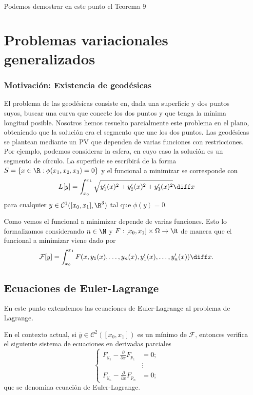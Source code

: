 \documentclass{article}
\begin{document}
Podemos demostrar en este punto el Teorema 9

\section{Problemas variacionales generalizados}

\subsubsection{Motivación: Existencia de geodésicas}

El problema de las geodésicas consiste en, dada una superficie y dos puntos suyos, buscar una curva
que conecte los dos puntos y que tenga la mínima longitud posible. Nosotros hemos resuelto
parcialmente este problema en el plano, obteniendo que la solución era el segmento que une los dos
puntos. Las geodésicas se plantean mediante un PV que dependen de varias funciones con
restricciones. Por ejemplo, podemos considerar la esfera, en cuyo caso la solución es un segmento de
círculo. La superficie se escribirá de la forma $S = \{x \in \R: \phi(x_1, x_2, x_3) = 0\}$ y el
funcional a minimizar se corresponde con
\[L[y] = \int_{x_0}^{x_1} \sqrt{y_1'(x)^2 + y_2'(x)^2 +y_3'(x)^2} \diff x\] para cualquier
$y \in \mathcal{C}^1([x_0, x_1], \R^3)$ tal que $\phi(y) = 0$.

Como vemos el funcional a minimizar depende de varias funciones. Esto lo formalizamos considerando
$n \in \N$ y $F : [x_0, x_1] \times \Omega \to \R$ de manera que el funcional a minimizar viene dado
por
\[\mathcal{F}[y] = \int_{x_0}^{x_1} F(x, y_1(x), \ldots, y_n(x), y_1'(x), \ldots, y_n'(x)) \diff
  x.\]

\subsection{Ecuaciones de Euler-Lagrange}

En este punto extendemos las ecuaciones de Euler-Lagrange al problema de Lagrange.

\begin{thm}
  En el contexto actual, si $\overline{y} \in \mathcal{C}^2([x_0, x_1])$ es un mínimo de
  $\mathcal{F}$, entonces verifica el siguiente sistema de ecuaciones en derivadas parciales
  \[
    \begin{cases}
      F_{y_1} - \frac{\partial}{\partial x} F_{p_1} & = 0;\\
      & \vdots \\
      F_{y_n} - \frac{\partial}{\partial x} F_{p_n} & =  0;
    \end{cases}
  \]
  que se denomina ecuación de Euler-Lagrange.
\end{thm}
\end{document}
